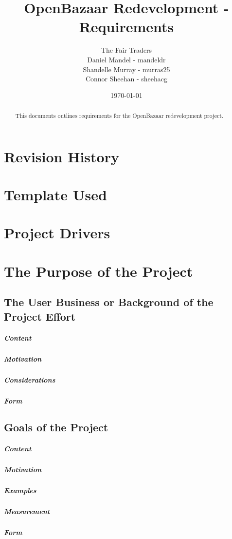 \documentclass{article}
\begin{document}
	

\title{OpenBazaar Redevelopment - Requirements}
\author{The Fair Traders \\ Daniel Mandel - mandeldr \\ Shandelle Murray - murras25 \\ Connor Sheehan - sheehacg}
\date{\today}
\maketitle
\tableofcontents
{}
\section*{Revision History}

\section*{Template Used}

\begin{abstract}
This documents outlines requirements for the OpenBazaar redevelopment project.
\end{abstract}

\section*{Project Drivers}

\section{The Purpose of the Project}

\subsection{The User Business or Background of the Project Effort}
\subparagraph{Content}
\subparagraph{Motivation}
\subparagraph{Considerations}
\subparagraph{Form}

\subsection{Goals of the Project}
\subparagraph{Content}
\subparagraph{Motivation}
\subparagraph{Examples}
\subparagraph{Measurement}
\subparagraph{Form}
\end{document}
